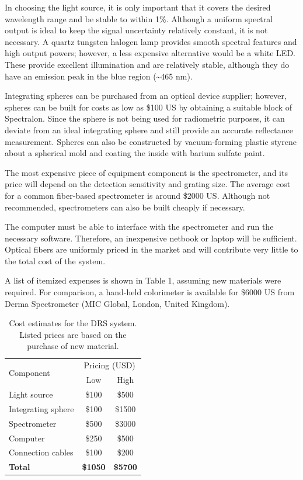 In choosing the light source, it is only important that it covers the desired wavelength range and be stable to within 1\%. Although a uniform spectral output is ideal to keep the signal uncertainty relatively constant, it is not necessary. A quartz tungsten halogen lamp provides smooth spectral features and high output powers; however, a less expensive alternative would be a white LED. These provide excellent illumination and are relatively stable, although they do have an emission peak in the blue region (\textasciitilde465 nm).

Integrating spheres can be purchased from an optical device supplier; however, spheres can be built for costs as low as \$100 US by obtaining a suitable block of Spectralon. Since the sphere is not being used for radiometric purposes, it can deviate from an ideal integrating sphere and still provide an accurate reflectance measurement. Spheres can also be constructed by vacuum-forming plastic styrene about a spherical mold and coating the inside with barium sulfate paint.\cite{Glennie2009}

The most expensive piece of equipment component is the spectrometer, and its price will depend on the detection sensitivity and grating size. The average cost for a common fiber-based spectrometer is around \$2000 US. Although not recommended, spectrometers can also be built cheaply if necessary.\cite{Sumriddetchkajorn2012}

The computer must be able to interface with the spectrometer and run the necessary software. Therefore, an inexpensive netbook or laptop will be sufficient. Optical fibers are uniformly priced in the market and will contribute very little to the total cost of the system.

A list of itemized expenses is shown in Table 1, assuming new materials were required. For comparison, a hand-held colorimeter is available for \$6000 US from Derma Spectrometer (MIC Global, London, United Kingdom).

\begin{table}[h]
	\centering
	\caption{Cost estimates for the DRS system. Listed prices are based on the purchase of new material.}
	\label{my-label}
	\begin{tabular}{lcc}
		\toprule
		\multirow{2}{*}{Component} & \multicolumn{2}{c}{Pricing (USD)} \\ \cmidrule(l){2-3} 
		& Low             & High            \\ \midrule
		Light source               & \$100           & \$500           \\
		Integrating sphere\qquad\qquad         & \$100           & \$1500          \\
		Spectrometer               & \$500           & \$3000          \\
		Computer                   & \$250           & \$500           \\
		Connection cables\qquad\qquad          & \$100           & \$200           \\
		\textbf{Total}             & \textbf{\qquad\$1050\qquad} & \textbf{\qquad\$5700\qquad} \\ \bottomrule
	\end{tabular}
\end{table}

